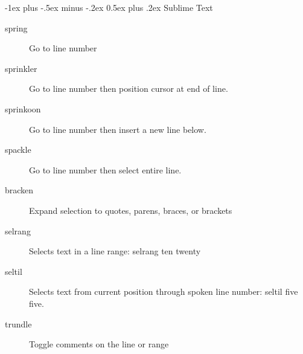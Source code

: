 \documentclass[10pt,landscape]{article}
\makeatletter
\renewcommand{\section}{\@startsection{section}{1}{0mm}%
                                {-1ex plus -.5ex minus -.2ex}%
                                {0.5ex plus .2ex}%
                                {\normalfont\large\bfseries}}
\makeatother
\begin{document}
\begin{multicols}{3}
\section{Sublime Text}
\begin{description}
\item [spring] Go to line number
\item [sprinkler] Go to line number then position cursor at end of line.
\item [sprinkoon] Go to line number then insert a new line below.
\item [spackle] Go to line number then select entire line.
\item [bracken] Expand selection to quotes, parens, braces, or brackets
\item [selrang] Selects text in a line range: selrang ten twenty
\item [seltil] Selects text from current position through spoken line number: seltil five five.
\item [trundle] Toggle comments on the line or range

\end{description}

\end{multicols}
\end{document}
